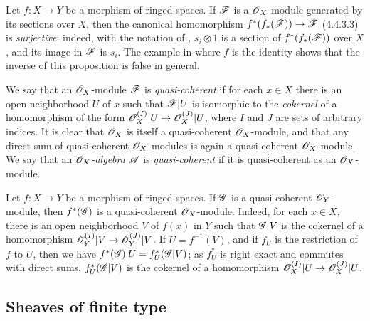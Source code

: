 \begin{env}[5.1.2]
\label{0.5.1.2}
Let $f:X\to Y$ be a morphism of ringed spaces.
If $\mathscr{F}$ is a $\mathscr{O}_X$-module generated by its sections over $X$, then the canonical homomorphism $f^*(f_*(\sh{F}))\to\sh{F}$ (4.4.3.3) is \emph{surjective};
indeed, with the notation of , $s_i\otimes 1$ is a section of $f^*(f_*(\mathscr{F}))$ over $X$, and its image in $\mathscr{F}$ is $s_i$.
The example in  where $f$ is the identity shows that the inverse of this proposition is false in general.

\end{env}

\begin{env}[5.1.3]
\label{0.5.1.3}
We say that an $\mathscr{O}_X$-module $\mathscr{F}$ is \emph{quasi-coherent} if for each $x\in X$ there is an open neighborhood $U$ of $x$ such that $\mathscr{F}|U$ is isomorphic to the \emph{cokernel} of a homomorphism of the form $\sh{O}_X^{(I)}|U\to\sh{O}_X^{(J)}|U$, where $I$ and $J$ are sets of arbitrary indices.
It is clear that $\mathscr{O}_X$ is itself a quasi-coherent $\mathscr{O}_X$-module, and that any direct sum of quasi-coherent $\mathscr{O}_X$-modules is again a quasi-coherent $\mathscr{O}_X$-module.
We say that an \emph{$\mathscr{O}_X$-algebra $\mathscr{A}$} is \emph{quasi-coherent} if it is quasi-coherent as an $\mathscr{O}_X$-module.
\end{env}

\begin{env}[5.1.4]
\label{0.5.1.4}
Let $f:X\to Y$ be a morphism of ringed spaces.
If $\mathscr{G}$ is a quasi-coherent $\mathscr{O}_Y$-module, then $f^*(\mathscr{G})$ is a quasi-coherent $\mathscr{O}_X$-module.
Indeed, for each $x\in X$, there is an open neighborhood $V$ of $f(x)$ in $Y$ such that $\mathscr{G}|V$ is the cokernel of a homomorphism $\sh{O}_Y^{(I)}|V\to\sh{O}_Y^{(J)}|V$.
If $U=f^{-1}(V)$, and if $f_U$ is the restriction of $f$ to $U$, then we have $f^*(\mathscr{G})|U=f_U^*(\mathscr{G}|V)$;
as $f_U^*$ is right exact and commutes with direct sums, $f_U^*(\mathscr{G}|V)$ is the cokernel of a homomorphism $\sh{O}_X^{(I)}|U\to\sh{O}_X^{(J)}|U$.
\end{env}

\subsection{Sheaves of finite type}
\label{subsection:0.5.2}

